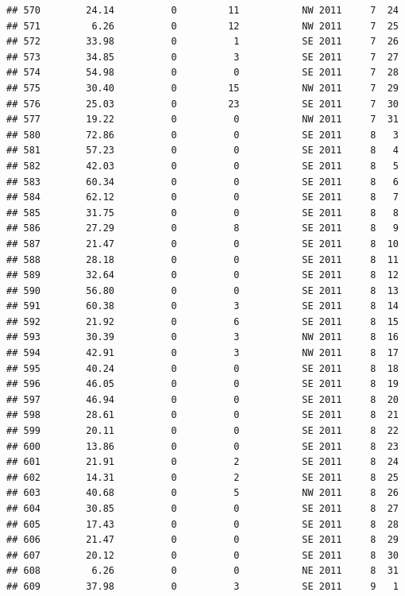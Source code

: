 \documentclass[
]{article}
\begin{document}
\begin{verbatim}
## 570        24.14          0         11           NW 2011     7  24
## 571         6.26          0         12           NW 2011     7  25
## 572        33.98          0          1           SE 2011     7  26
## 573        34.85          0          3           SE 2011     7  27
## 574        54.98          0          0           SE 2011     7  28
## 575        30.40          0         15           NW 2011     7  29
## 576        25.03          0         23           SE 2011     7  30
## 577        19.22          0          0           NW 2011     7  31
## 580        72.86          0          0           SE 2011     8   3
## 581        57.23          0          0           SE 2011     8   4
## 582        42.03          0          0           SE 2011     8   5
## 583        60.34          0          0           SE 2011     8   6
## 584        62.12          0          0           SE 2011     8   7
## 585        31.75          0          0           SE 2011     8   8
## 586        27.29          0          8           SE 2011     8   9
## 587        21.47          0          0           SE 2011     8  10
## 588        28.18          0          0           SE 2011     8  11
## 589        32.64          0          0           SE 2011     8  12
## 590        56.80          0          0           SE 2011     8  13
## 591        60.38          0          3           SE 2011     8  14
## 592        21.92          0          6           SE 2011     8  15
## 593        30.39          0          3           NW 2011     8  16
## 594        42.91          0          3           NW 2011     8  17
## 595        40.24          0          0           SE 2011     8  18
## 596        46.05          0          0           SE 2011     8  19
## 597        46.94          0          0           SE 2011     8  20
## 598        28.61          0          0           SE 2011     8  21
## 599        20.11          0          0           SE 2011     8  22
## 600        13.86          0          0           SE 2011     8  23
## 601        21.91          0          2           SE 2011     8  24
## 602        14.31          0          2           SE 2011     8  25
## 603        40.68          0          5           NW 2011     8  26
## 604        30.85          0          0           SE 2011     8  27
## 605        17.43          0          0           SE 2011     8  28
## 606        21.47          0          0           SE 2011     8  29
## 607        20.12          0          0           SE 2011     8  30
## 608         6.26          0          0           NE 2011     8  31
## 609        37.98          0          3           SE 2011     9   1

\end{verbatim}
\end{document}

